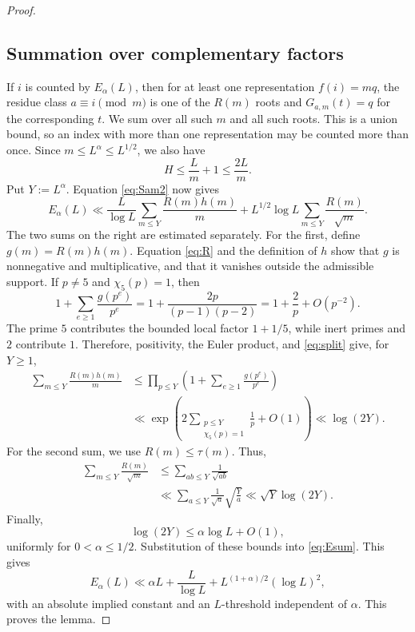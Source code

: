 \documentclass[11pt]{amsart}
\theoremstyle{definition}
\theoremstyle{remark}
\begin{document}
\begin{proof}
\subsection{Summation over complementary factors}

If $i$ is counted by $E_\alpha(L)$,
then for at least one representation $f(i)=mq$, the residue class
$a\equiv i\pmod m$ is one of the $R(m)$ roots and $G_{a,m}(t)=q$ for the
corresponding $t$.  We sum over all such $m$ and all such roots.  This is a
union bound, so an index with more than one representation may be counted
more than once.  Since $m\leq L^\alpha\leq L^{1/2}$, we also have
\[
H\leq\frac Lm+1\leq\frac{2L}{m}.
\]
Put $Y:=L^\alpha$.  Equation \eqref{eq:Sam2} now gives
\begin{equation}\label{eq:Esum}
E_\alpha(L)
\ll
\frac{L}{\log L}
\sum_{m\leq Y}\frac{R(m)h(m)}m
+L^{1/2}\log L
\sum_{m\leq Y}\frac{R(m)}{\sqrt m}.
\end{equation}
The two sums on the right are estimated separately.  For the first, define
$g(m)=R(m)h(m)$.  Equation \eqref{eq:R} and the definition of $h$ show that
$g$ is nonnegative and multiplicative, and that it vanishes outside the
admissible support.  If $p\neq5$ and $\chi_5(p)=1$, then
  \[
  1+\sum_{e\geq1}\frac{g(p^e)}{p^e}
  =1+\frac{2p}{(p-1)(p-2)}
  =1+\frac2p+O(p^{-2}).
  \]
The prime $5$ contributes the bounded local factor $1+1/5$, while inert
primes and $2$ contribute $1$.  Therefore, positivity, the Euler product,
and \eqref{eq:split} give, for $Y\geq1$,
  \begin{align*}
  \sum_{m\leq Y}\frac{R(m)h(m)}m
  &\leq
  \prod_{p\leq Y}\left(1+\sum_{e\geq1}\frac{g(p^e)}{p^e}\right)\\
  &\ll
  \exp\left(
  2\sum_{\substack{p\leq Y\\ \chi_5(p)=1}}\frac1p+O(1)
  \right)
  \ll\log(2Y).
  \end{align*}
For the second sum, we use $R(m)\leq\tau(m)$.  Thus,
\begin{align*}
\sum_{m\leq Y}\frac{R(m)}{\sqrt m}
&\leq
\sum_{ab\leq Y}\frac1{\sqrt{ab}}\\
&\ll
\sum_{a\leq Y}\frac1{\sqrt a}\sqrt{\frac Ya}
\ll\sqrt Y\log(2Y).
\end{align*}
Finally,
  \[
  \log(2Y)\leq\alpha\log L+O(1),
  \]
uniformly for $0<\alpha\leq1/2$.  Substitution of these bounds into
\eqref{eq:Esum}.  This gives
  \[
  E_\alpha(L)
  \ll \alpha L+\frac{L}{\log L}
  +L^{(1+\alpha)/2}(\log L)^2,
  \]
with an absolute implied constant and an $L$-threshold independent of
$\alpha$.  This proves the lemma.
\end{proof}
\end{document}
